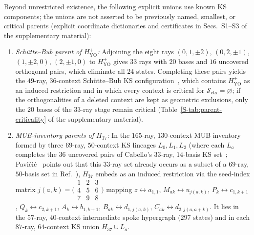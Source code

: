\documentclass[aps,pra,reprint,superscriptaddress,longbibliography,nofootinbib,floatfix,10pt]{revtex4-2}
\theoremstyle{definition}\newtheorem{definition}[theorem]{Definition}
\theoremstyle{remark}\newtheorem{remark}[theorem]{Remark}
\newcommand{\Sc}{\mathcal S}\newcommand{\Cc}{\mathcal C}
\newcommand{\YO}{\mathrm{YO}}\newcommand{\ip}[2]{\langle #1,#2\rangle}
\begin{document}
Beyond unrestricted existence, the following explicit unions use known KS components; the unions are not asserted to be previously named, smallest, or critical parents (explicit coordinate dictionaries and certificates in Secs.~S1--S3 of the supplementary material):
\begin{enumerate}
\item \emph{Sch\"utte--Bub parent of $H_{\YO}^{+}$:} Adjoining the eight rays $(0,1,\pm2)$, $(0,2,\pm1)$, $(1,\pm2,0)$, $(2,\pm1,0)$ to $H_{\YO}^{+}$ gives $33$ rays with $20$ bases and $16$ uncovered orthogonal pairs, which eliminate all $24$ states. Completing these pairs yields the $49$-ray, $36$-context Sch\"utte--Bub KS configuration~\cite{bub,Pavicic-2005}, which contains $H_{\YO}^{+}$ as an induced restriction and in which every context is critical for $\Sc_{\mathrm{ctx}}=\varnothing$; if the orthogonalities of a deleted context are kept as geometric exclusions, only the $20$ bases of the $33$-ray stage remain critical (Table~\ref{S-tab:parent-criticality} of the supplementary material).
\item \emph{MUB-inventory parents of $H_{37}$:} In the $165$-ray, $130$-context MUB inventory~\cite{svozil-2025-MYOCHS} formed by three $69$-ray, $50$-context KS lineages $L_0,L_1,L_2$ (where each $L_a$ completes the $36$ uncovered pairs of Cabello's $33$-ray, $14$-basis KS set~\cite{Cabello2025}; Pavi\v{c}i\'c~\cite{Pavicic-2025-simplest} points out that this $33$-ray set already occurs as a subset of a $69$-ray, $50$-basis set in Ref.~\cite{Pavicic_2023}), $H_{37}$ embeds as an induced restriction via the seed-index matrix $j(a,k)=\bigl(\begin{smallmatrix}1&2&3\\4&5&6\\7&9&8\end{smallmatrix}\bigr)$ mapping $z\leftrightarrow a_{1,1}$, $M_{ak}\leftrightarrow u_{j(a,k)}$, $P_k\leftrightarrow c_{1,k+1}$, $Q_k\leftrightarrow c_{2,k+1}$, $A_k\leftrightarrow b_{1,k+1}$, $B_{ak}\leftrightarrow d_{1,j(a,k)}$, $C_{ak}\leftrightarrow d_{2,j(a,a+k)}$. It lies in the $57$-ray, $40$-context intermediate spoke hypergraph ($297$ states) and in each $87$-ray, $64$-context KS union $H_{37}\cup L_a$.

\end{enumerate}
\end{document}
